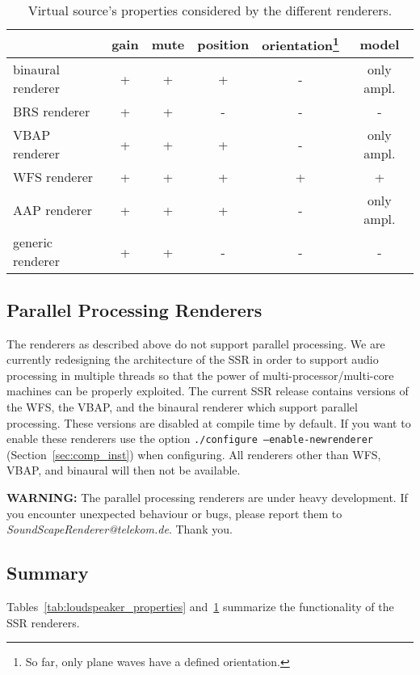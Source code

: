 \begin{table}%
\begin{center}%
\begin{minipage}{\textwidth}%
\begin{tabular}{| l | c | c | c | c | c |}
\hline
      & gain & mute & position & orientation\footnote{So far, only plane waves have a defined
orientation.} & model\\
                    \hline
 binaural renderer & + & + & + & - & only ampl.\\
 BRS renderer      & + & + & - & - & -\\
 VBAP renderer     & + & + & + & - & only ampl.\\
 WFS renderer      & + & + & + & + & +\\
 AAP renderer      & + & + & + & - & only ampl.\\
 generic renderer  & + & + & - & - & -\\\hline
\end{tabular}
\end{minipage}
\caption{\label{tab:source_properties}Virtual source's properties
considered by the different renderers.}
\end{center}
\end{table}


\subsection{Parallel Processing Renderers}

The renderers as described above do not support parallel processing. We are
currently redesigning the architecture of the SSR in order to support audio
processing in multiple threads so that the power of multi-processor/multi-core machines can be
properly exploited. The current SSR release contains versions of the WFS, the
VBAP, and the binaural renderer which support parallel processing. These
versions are disabled at compile time by default.
If you want to enable these renderers use the option \texttt{./configure
--enable-newrenderer} (Section~\ref{sec:comp_inst}) when configuring. All
renderers other than WFS, VBAP, and binaural will then not be available.

\textbf{WARNING:} The parallel processing renderers are under heavy development.
If you encounter unexpected behaviour or bugs, please report them to 
\emph{SoundScapeRenderer@telekom.de}. Thank you. 

\subsection{Summary}

Tables~\ref{tab:loudspeaker_properties}
and~\ref{tab:source_properties} summarize the functionality of the
SSR renderers.

